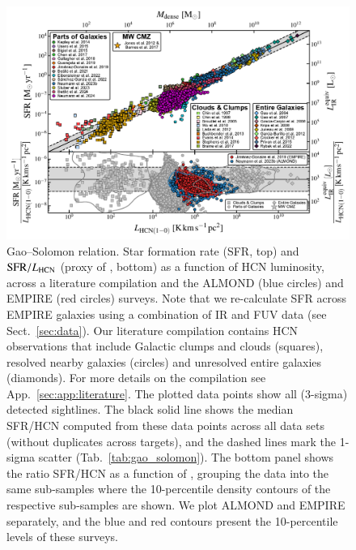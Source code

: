 \documentclass[letter, longauth]{aa} %
\begin{document}
\begin{figure}
\centering
\includegraphics[width=\textwidth]{Figures/GS_relation_literature_compilation_compressed.pdf}
\caption{Gao--Solomon relation. Star formation rate (SFR, top) and $\mathrm{SFR}/L_{\text{HCN}}$ (proxy of \sfedense, bottom) as a function of HCN luminosity, across a literature compilation and the ALMOND (blue circles) and EMPIRE (red circles) surveys.
Note that we re-calculate SFR across EMPIRE galaxies using a combination of IR and FUV data (see Sect.~\ref{sec:data}).
Our literature compilation contains HCN observations that include Galactic clumps and clouds (squares), resolved nearby galaxies (circles) and unresolved entire galaxies (diamonds).
For more details on the compilation see App.~\ref{sec:app:literature}.
The plotted data points show all (3-sigma) detected sightlines.
The black solid line shows the median SFR/HCN computed from these data points across all data sets (without duplicates across targets), and the dashed lines mark the 1-sigma scatter (Tab.~\ref{tab:gao_solomon}).
The bottom panel shows the ratio SFR/HCN as a function of \lhcn, grouping the data into the same sub-samples where the 10-percentile density contours of the respective sub-samples are shown.
We plot ALMOND and EMPIRE separately, and the blue and red contours present the 10-percentile levels of these surveys.
}
\label{fig:gao_solomon_relation}
\end{figure}
\end{document}
